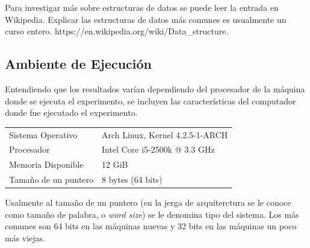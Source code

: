 \documentclass[12pt,letterpaper]{report}
\begin{document}
Para investigar más sobre estructuras de datos se puede leer la entrada en Wikipedia. Explicar las estructuras de datos más comunes es usualmente un curso entero. https://en.wikipedia.org/wiki/Data\_structure.

\subsection{Ambiente de Ejecución}
\label{subsec:ambiente}

Entendiendo que los resultados varían dependiendo del procesador de la máquina donde se ejecuta el experimento, se incluyen las características del computador donde fue ejecutado el experimento.\\

\begin{tabular}{ll}
  Sistema Operativo & Arch Linux, Kernel 4.2.5-1-ARCH\\
  Procesador & Intel Core i5-2500k @ 3.3 GHz\\
  Memoria Disponible & 12 GiB\\
  Tamaño de un puntero & 8 bytes (64 bits)\\
\end{tabular}

Usalmente al tamaño de un puntero (en la jerga de arquiterctura se le conoce como tamaño de palabra, o \emph{word size}) se le denomina tipo del sistema. Los más comunes son 64 bits en las máquinas nuevas y 32 bits en las máquinas un poco más viejas.
\end{document}
